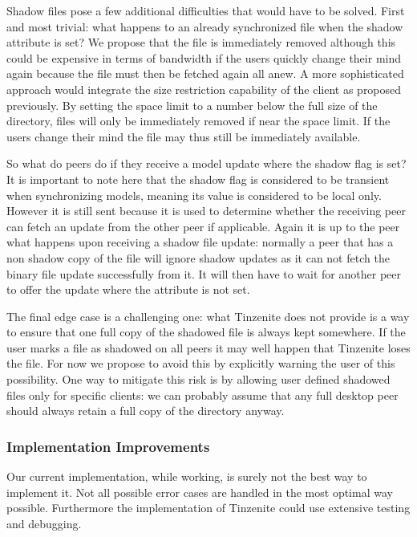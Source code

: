 Shadow files pose a few additional difficulties that would have to be solved.
First and most trivial: what happens to an already synchronized file when the shadow attribute is set?
We propose that the file is immediately removed although this could be expensive in terms of bandwidth if the users quickly change their mind again because the file must then be fetched again all anew.
A more sophisticated approach would integrate the size restriction capability of the client as proposed previously.
By setting the space limit to a number below the full size of the directory, files will only be immediately removed if near the space limit.
If the users change their mind the file may thus still be immediately available.

So what do peers do if they receive a model update where the shadow flag is set?
It is important to note here that the shadow flag is considered to be transient when synchronizing models, meaning its value is considered to be local only.
However it is still sent because it is used to determine whether the receiving peer can fetch an update from the other peer if applicable.
Again it is up to the peer what happens upon receiving a shadow file update: normally a peer that has a non shadow copy of the file will ignore shadow updates as it can not fetch the binary file update successfully from it.
It will then have to wait for another peer to offer the update where the attribute is not set.

The final edge case is a challenging one: what Tinzenite does not provide is a way to ensure that one full copy of the shadowed file is always kept somewhere.
If the user marks a file as shadowed on all peers it may well happen that Tinzenite loses the file.
For now we propose to avoid this by explicitly warning the user of this possibility.
One way to mitigate this risk is by allowing user defined shadowed files only for specific clients: we can probably assume that any full desktop peer should always retain a full copy of the directory anyway.

\subsubsection{Implementation Improvements}
\label{subs:Implementation Improvements}

Our current implementation, while working, is surely not the best way to implement it.
Not all possible error cases are handled in the most optimal way possible.
Furthermore the implementation of Tinzenite could use extensive testing and debugging.

